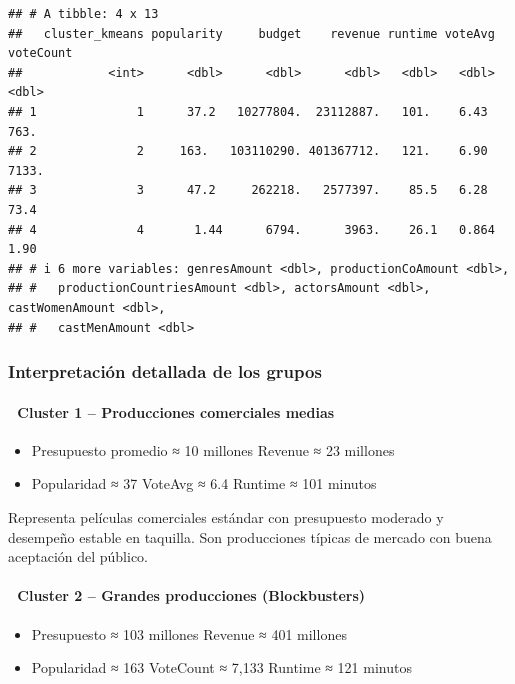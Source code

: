 \documentclass[
]{article}
\providecommand{\tightlist}{%
  \setlength{\itemsep}{0pt}\setlength{\parskip}{0pt}}
\begin{document}
\begin{verbatim}
## # A tibble: 4 x 13
##   cluster_kmeans popularity     budget    revenue runtime voteAvg voteCount
##            <int>      <dbl>      <dbl>      <dbl>   <dbl>   <dbl>     <dbl>
## 1              1      37.2   10277804.  23112887.   101.    6.43     763.  
## 2              2     163.   103110290. 401367712.   121.    6.90    7133.  
## 3              3      47.2     262218.   2577397.    85.5   6.28      73.4 
## 4              4       1.44      6794.      3963.    26.1   0.864      1.90
## # i 6 more variables: genresAmount <dbl>, productionCoAmount <dbl>,
## #   productionCountriesAmount <dbl>, actorsAmount <dbl>, castWomenAmount <dbl>,
## #   castMenAmount <dbl>
\end{verbatim}

\subsubsection{Interpretación detallada de los
grupos}\label{interpretaciuxf3n-detallada-de-los-grupos}

\paragraph{🔵 Cluster 1 -- Producciones comerciales
medias}\label{cluster-1-producciones-comerciales-medias}

\begin{itemize}
\tightlist
\item
  Presupuesto promedio ≈ 10 millones \textbar{} Revenue ≈ 23 millones\\
\item
  Popularidad ≈ 37 \textbar{} VoteAvg ≈ 6.4 \textbar{} Runtime ≈ 101
  minutos
\end{itemize}

Representa películas comerciales estándar con presupuesto moderado y
desempeño estable en taquilla. Son producciones típicas de mercado con
buena aceptación del público.

\paragraph{🔴 Cluster 2 -- Grandes producciones
(Blockbusters)}\label{cluster-2-grandes-producciones-blockbusters}

\begin{itemize}
\tightlist
\item
  Presupuesto ≈ 103 millones \textbar{} Revenue ≈ 401 millones\\
\item
  Popularidad ≈ 163 \textbar{} VoteCount ≈ 7,133 \textbar{} Runtime ≈
  121 minutos
\end{itemize}
\end{document}
